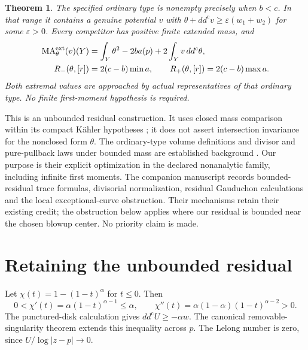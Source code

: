 \documentclass[11pt]{article}
\newtheorem{theorem}{Theorem}
\theoremstyle{remark}
\newcommand{\ddc}{dd^{\mathrm c}}
\newcommand{\MA}{\operatorname{MA}}
\begin{document}
\newpage
\begin{theorem}\label{thm:mass}
The specified ordinary type is nonempty precisely when $b<c$. In that
range it contains a genuine potential $v$ with
$\theta+\ddc v\geq\varepsilon(w_1+w_2)$ for some $\varepsilon>0$.
Every competitor has positive finite extended mass, and
\begin{align}
 \MA^{\rm ext}_\theta(v)(Y)
   &=\int_Y\theta^2-2b a(p)+2\int_Yv\,\ddc\theta,\label{eq:affine}\\
 R_-(\theta,[r])&=2(c-b)\min a,\qquad
 R_+(\theta,[r])=2(c-b)\max a.\label{eq:extrema}
\end{align}
Both extremal values are approached by actual representatives of that
ordinary type. No finite first-moment hypothesis is required.
\end{theorem}

This is an unbounded residual construction. It uses closed mass comparison
within its compact K\"ahler hypotheses \cite{BEGZ}; it does not assert
intersection invariance for the nonclosed form $\theta$.
The ordinary-type volume definitions and divisor and pure-pullback laws
under bounded mass are established background
\cite[Definition~3.1 and Proposition~3.3]{BGL}. Our purpose is their explicit
optimization in the declared nonanalytic family, including infinite first
moments. The companion manuscript \cite{Companion} records bounded-residual
trace formulas, divisorial normalization, residual Gauduchon calculations
and the local exceptional-curve obstruction. Their mechanisms retain their
existing credit; the obstruction below applies where our residual is bounded
near the chosen blowup center. No priority claim is made.

\section{Retaining the unbounded residual}
Let $\chi(t)=1-(1-t)^\alpha$ for $t\leq0$. Then
\[
 0<\chi'(t)=\alpha(1-t)^{\alpha-1}\leq\alpha,
 \qquad \chi''(t)=\alpha(1-\alpha)(1-t)^{\alpha-2}>0.
\]
The punctured-disk calculation gives
$\ddc U\geq-\alpha w$. The canonical removable-singularity theorem
\cite[I.5.23--5.24]{Demailly} extends this inequality across $p$.
The Lelong number is zero, since $U/\log|z-p|\to0$.
\end{document}
